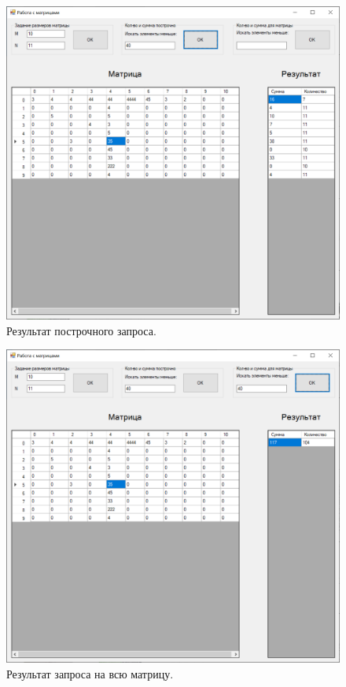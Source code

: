 \documentclass[a4paper,12pt]{article}
\theoremstyle{plain}
\theoremstyle{remark}
\theoremstyle{definition}
\begin{document}
	\begin{figure}[h!]
		\centering
		\includegraphics[width=.9\linewidth]{4.png}
		\caption{Результат построчного запроса.}
	\end{figure}
	
	\begin{figure}[h!]
		\centering
		\includegraphics[width=.9\linewidth]{5.png}
		\caption{Результат запроса на всю матрицу.}
	\end{figure}
	
\end{document}
